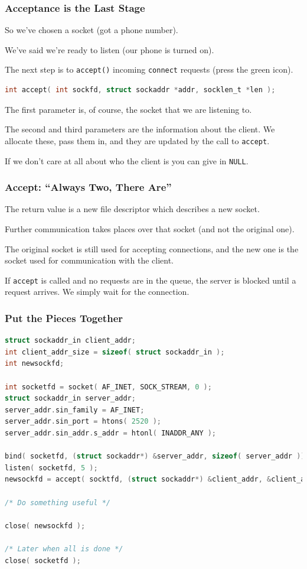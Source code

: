 \begin{frame}[fragile]
\frametitle{Acceptance is the Last Stage}

So we've chosen a socket (got a phone number). 

We've said we're ready to listen (our phone is turned on). 

The next step is to \texttt{accept()} incoming \texttt{connect} requests (press the green icon). 

\begin{lstlisting}[language=C]
int accept( int sockfd, struct sockaddr *addr, socklen_t *len ); 
\end{lstlisting}

The first parameter is, of course, the socket that we are listening to. 

The second and third parameters are the information about the client. We allocate these, pass them in, and they are updated by the call to \texttt{accept}.

If we don't care at all about who the client is you can give in \texttt{NULL}.

\end{frame}


\begin{frame}
\frametitle{Accept: ``Always Two, There Are''}

The return value is a new file descriptor which describes a new socket. 

Further communication takes places over that socket (and not the original one).

 The original socket is still used for accepting connections, and the new one is the socket used for communication with the client.

If \texttt{accept} is called and no requests are in the queue, the server is blocked until a request arrives. We simply wait for the connection.

\end{frame}


\begin{frame}[fragile]
\frametitle{Put the Pieces Together}

\begin{lstlisting}[language=C]
struct sockaddr_in client_addr;
int client_addr_size = sizeof( struct sockaddr_in );
int newsockfd;

int socketfd = socket( AF_INET, SOCK_STREAM, 0 );
struct sockaddr_in server_addr;
server_addr.sin_family = AF_INET;
server_addr.sin_port = htons( 2520 );
server_addr.sin_addr.s_addr = htonl( INADDR_ANY );

bind( socketfd, (struct sockaddr*) &server_addr, sizeof( server_addr ));
listen( socketfd, 5 );
newsockfd = accept( socktfd, (struct sockaddr*) &client_addr, &client_addr_size );

/* Do something useful */

close( newsockfd );

/* Later when all is done */
close( socketfd );
\end{lstlisting}
\end{frame}


